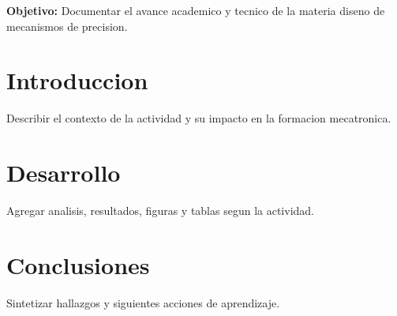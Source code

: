 \documentclass[spanish,letterpaper,oneside]{article}
\begin{document}
\templatePortrait
\templatePagecfg
\onehalfspacing

\begin{abstractd}
\textbf{Objetivo:} Documentar el avance academico y tecnico de la materia diseno de mecanismos de precision.
\end{abstractd}

\templateIndex
\templateFinalcfg

\section{Introduccion}
Describir el contexto de la actividad y su impacto en la formacion mecatronica.

\section{Desarrollo}
Agregar analisis, resultados, figuras y tablas segun la actividad.

\section{Conclusiones}
Sintetizar hallazgos y siguientes acciones de aprendizaje.



\end{document}
